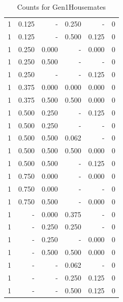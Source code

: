\documentclass[a4paper]{article}\usepackage[]{graphicx}\usepackage[]{color}
\begin{document}
\begin{table}[ht]
\begin{tabular}{rrrrrr}
   \rowcolor{sosoColor} 1 & 0.125 & - & 0.250 & - & 0 \\ 
   \rowcolor{sosoColor} 1 & 0.125 & - & 0.500 & 0.125 & 0 \\ 
  1 & 0.250 & 0.000 & - & 0.000 & 0 \\ 
  1 & 0.250 & 0.500 & - & - & 0 \\ 
   \rowcolor{nullColor} 1 & 0.250 & - & - & 0.125 & 0 \\ 
   \rowcolor{goodColor} 1 & 0.375 & 0.000 & 0.000 & 0.000 & 0 \\ 
   \rowcolor{goodColor} 1 & 0.375 & 0.500 & 0.500 & 0.000 & 0 \\ 
  1 & 0.500 & 0.250 & - & 0.125 & 0 \\ 
  1 & 0.500 & 0.250 & - & - & 0 \\ 
   \rowcolor{badColor} 1 & 0.500 & 0.500 & 0.062 & - & 0 \\ 
   \rowcolor{goodColor} 1 & 0.500 & 0.500 & 0.500 & 0.000 & 0 \\ 
  1 & 0.500 & 0.500 & - & 0.125 & 0 \\ 
  1 & 0.750 & 0.000 & - & 0.000 & 0 \\ 
  1 & 0.750 & 0.000 & - & - & 0 \\ 
  1 & 0.750 & 0.500 & - & 0.000 & 0 \\ 
   \rowcolor{badColor} 1 & - & 0.000 & 0.375 & - & 0 \\ 
   \rowcolor{goodColor} 1 & - & 0.250 & 0.250 & - & 0 \\ 
  1 & - & 0.250 & - & 0.000 & 0 \\ 
   \rowcolor{goodColor} 1 & - & 0.500 & 0.500 & 0.000 & 0 \\ 
   \rowcolor{sosoColor} 1 & - & - & 0.062 & - & 0 \\ 
   \rowcolor{sosoColor} 1 & - & - & 0.250 & 0.125 & 0 \\ 
   \rowcolor{sosoColor} 1 & - & - & 0.500 & 0.125 & 0 \\ 
   \hline
\end{tabular}
\caption{Counts for Gen1Housemates} 
\end{table}
\end{document}
